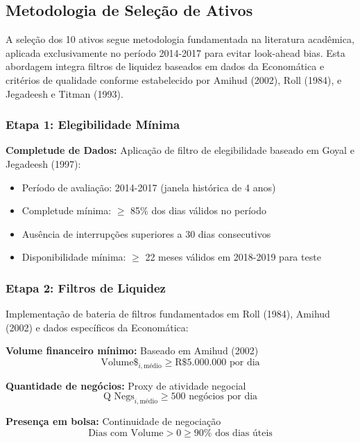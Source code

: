 \subsection{Metodologia de Seleção de Ativos}

A seleção dos 10 ativos segue metodologia fundamentada na literatura acadêmica, aplicada exclusivamente no período 2014-2017 para evitar look-ahead bias. Esta abordagem integra filtros de liquidez baseados em dados da Economática e critérios de qualidade conforme estabelecido por Amihud (2002), Roll (1984), e Jegadeesh e Titman (1993).

\subsubsection{Etapa 1: Elegibilidade Mínima}

\textbf{Completude de Dados:} Aplicação de filtro de elegibilidade baseado em Goyal e Jegadeesh (1997):
\begin{itemize}
    \item Período de avaliação: 2014-2017 (janela histórica de 4 anos)
    \item Completude mínima: $\geq$ 85\% dos dias válidos no período
    \item Ausência de interrupções superiores a 30 dias consecutivos
    \item Disponibilidade mínima: $\geq$ 22 meses válidos em 2018-2019 para teste
\end{itemize}

\subsubsection{Etapa 2: Filtros de Liquidez}

Implementação de bateria de filtros fundamentados em Roll (1984), Amihud (2002) e dados específicos da Economática:

\textbf{Volume financeiro mínimo:} Baseado em Amihud (2002)
\begin{equation}
\text{Volume}\$_{i,\text{médio}} \geq \text{R\$ 5.000.000 por dia}
\end{equation}

\textbf{Quantidade de negócios:} Proxy de atividade negocial
\begin{equation}
\text{Q Negs}_{i,\text{médio}} \geq 500 \text{ negócios por dia}
\end{equation}

\textbf{Presença em bolsa:} Continuidade de negociação
\begin{equation}
\text{Dias com Volume} > 0 \geq 90\% \text{ dos dias úteis}
\end{equation}

